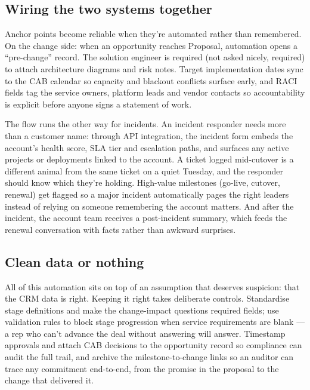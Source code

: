 \subsection{Wiring the two systems together}


Anchor points become reliable when they're automated rather than remembered. On the change side: when an opportunity reaches Proposal, automation opens a ``pre-change'' record. The solution engineer is required (not asked nicely, required) to attach architecture diagrams and risk notes. Target implementation dates sync to the CAB calendar so capacity and blackout conflicts surface early, and RACI fields tag the service owners, platform leads and vendor contacts so accountability is explicit before anyone signs a statement of work.


The flow runs the other way for incidents. An incident responder needs more than a customer name: through API integration, the incident form embeds the account's health score, SLA tier and escalation paths, and surfaces any active projects or deployments linked to the account. A ticket logged mid-cutover is a different animal from the same ticket on a quiet Tuesday, and the responder should know which they're holding. High-value milestones (go-live, cutover, renewal) get flagged so a major incident automatically pages the right leaders instead of relying on someone remembering the account matters. And after the incident, the account team receives a post-incident summary, which feeds the renewal conversation with facts rather than awkward surprises.



\subsection{Clean data or nothing}


All of this automation sits on top of an assumption that deserves suspicion: that the CRM data is right. Keeping it right takes deliberate controls. Standardise stage definitions and make the change-impact questions required fields; use validation rules to block stage progression when service requirements are blank — a rep who can't advance the deal without answering will answer. Timestamp approvals and attach CAB decisions to the opportunity record so compliance can audit the full trail, and archive the milestone-to-change links so an auditor can trace any commitment end-to-end, from the promise in the proposal to the change that delivered it.


